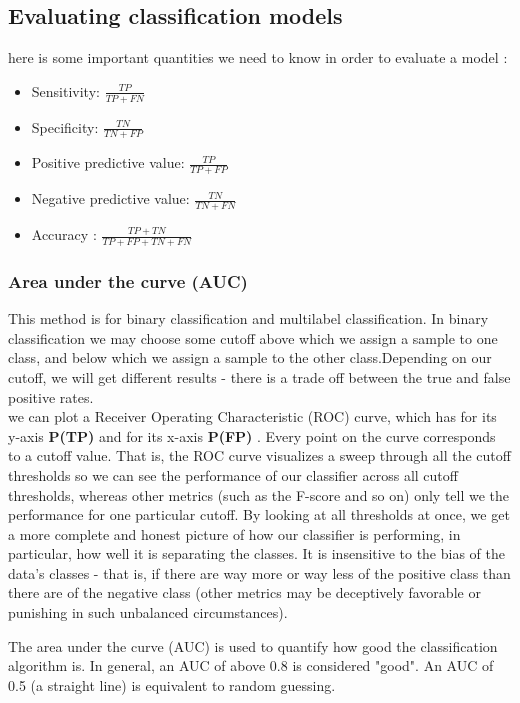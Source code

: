 \subsection{Evaluating classification models}\label{eva}

here is some important quantities we need to know in order to evaluate a model :
\begin{itemize}
\item Sensitivity: $ \frac{TP}{TP+FN}$ 
\item Specificity: $\frac{TN}{TN+FP}$
\item Positive predictive value:  $\frac{TP}{TP+FP}$ 
\item Negative predictive value: $\frac{TN}{TN+FN}$
\item Accuracy : $\frac{TP+TN}{TP+FP+TN+FN}$
\end{itemize}

\subsubsection{Area under the curve (AUC)}

This method is for binary classification and multilabel classification. In binary classification we may choose some cutoff above which we assign a sample to one class, and below which we assign a sample to the other class.Depending on our cutoff, we will get different results - there is a trade off between the true and false positive rates.\\
we can plot a Receiver Operating Characteristic (ROC) curve, which has for its y-axis \textbf{P(TP)}  and for its x-axis \textbf{P(FP)} . Every point on the curve corresponds to a cutoff value. That is, the ROC curve visualizes a sweep through all the cutoff thresholds so we can see the performance of our classifier across all cutoff thresholds, whereas other metrics (such as the F-score and so on) only tell we the performance for one particular cutoff. By looking at all thresholds at once, we get a more complete and honest picture of how our classifier is performing, in particular, how well it is separating the classes. It is insensitive to the bias of the data's classes - that is, if there are way more or way less of the positive class than there are of the negative class (other metrics may be deceptively favorable or punishing in such unbalanced circumstances).

The area under the curve (AUC) is used to quantify how good the classification algorithm is. In general, an AUC of above 0.8 is considered "good". An AUC of 0.5 (a straight line) is equivalent to random guessing.  


